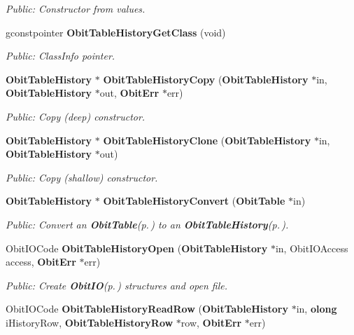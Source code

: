 \begin{CompactItemize}
\begin{CompactList}\small\item\em Public: Constructor from values. \item\end{CompactList}\item 
gconstpointer {\bf Obit\-Table\-History\-Get\-Class} (void)
\begin{CompactList}\small\item\em Public: Class\-Info pointer. \item\end{CompactList}\item 
{\bf Obit\-Table\-History} $\ast$ {\bf Obit\-Table\-History\-Copy} ({\bf Obit\-Table\-History} $\ast$in, {\bf Obit\-Table\-History} $\ast$out, {\bf Obit\-Err} $\ast$err)
\begin{CompactList}\small\item\em Public: Copy (deep) constructor. \item\end{CompactList}\item 
{\bf Obit\-Table\-History} $\ast$ {\bf Obit\-Table\-History\-Clone} ({\bf Obit\-Table\-History} $\ast$in, {\bf Obit\-Table\-History} $\ast$out)
\begin{CompactList}\small\item\em Public: Copy (shallow) constructor. \item\end{CompactList}\item 
{\bf Obit\-Table\-History} $\ast$ {\bf Obit\-Table\-History\-Convert} ({\bf Obit\-Table} $\ast$in)
\begin{CompactList}\small\item\em Public: Convert an {\bf Obit\-Table}{\rm (p.\,\pageref{structObitTable})} to an {\bf Obit\-Table\-History}{\rm (p.\,\pageref{structObitTableHistory})}. \item\end{CompactList}\item 
Obit\-IOCode {\bf Obit\-Table\-History\-Open} ({\bf Obit\-Table\-History} $\ast$in, Obit\-IOAccess access, {\bf Obit\-Err} $\ast$err)
\begin{CompactList}\small\item\em Public: Create {\bf Obit\-IO}{\rm (p.\,\pageref{structObitIO})} structures and open file. \item\end{CompactList}\item 
Obit\-IOCode {\bf Obit\-Table\-History\-Read\-Row} ({\bf Obit\-Table\-History} $\ast$in, {\bf olong} i\-History\-Row, {\bf Obit\-Table\-History\-Row} $\ast$row, {\bf Obit\-Err} $\ast$err)

\end{CompactItemize}

